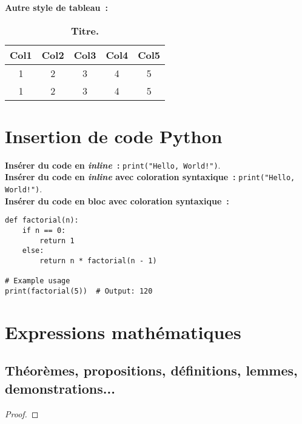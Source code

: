 \textbf{Autre style de tableau~:} 
\begin{table}[H]
    \centering
    \begin{tabular}{c c c c c}
        \hline
        \textbf{Col1} & \textbf{Col2} & \textbf{Col3} & \textbf{Col4} & \textbf{Col5} \\
        \hline
        1 & 2 & 3 & 4 & 5 \\
        1 & 2 & 3 & 4 & 5 \\
        \hline
    \end{tabular}
    \caption{\textbf{Titre.} \lipsum[1][1-3]}
    \label{tab:table-label}
\end{table}


\section{Insertion de code Python}
\textbf{Insérer du code en \textit{inline}~:} \texttt{print("Hello, World!")}.\\


\textbf{Insérer du code en \textit{inline} avec coloration syntaxique~:} \texttt{print("Hello, World!")}.\\

\textbf{Insérer du code en bloc avec coloration syntaxique~:} 
\begin{verbatim}
def factorial(n):
    if n == 0:
        return 1
    else:
        return n * factorial(n - 1)

# Example usage
print(factorial(5))  # Output: 120
\end{verbatim}



\section{Expressions mathématiques}
\subsection{Théorèmes, propositions, définitions, lemmes, demonstrations...}

\begin{theorem}
    \lipsum[1][1-4]
\end{theorem}

\begin{proof}
    \lipsum[1][1-4]
\end{proof}

\begin{proposition}
    \lipsum[1][1-4]
\end{proposition}

